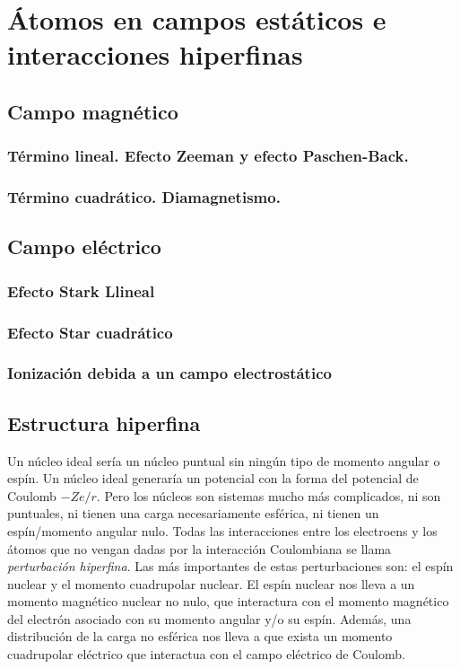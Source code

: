 \chapter{Átomos en campos estáticos e interacciones hiperfinas} \label{Ch:02}

\section{Campo magnético}

\subsection{Término lineal. Efecto Zeeman y efecto Paschen-Back.}

\subsection{Término cuadrático. Diamagnetismo.}

\section{Campo eléctrico}

\subsection{Efecto Stark Llineal}

\subsection{Efecto Star cuadrático}

\subsection{Ionización debida a un campo electrostático}

\section{Estructura hiperfina}

Un núcleo ideal sería un núcleo puntual sin ningún tipo de momento angular o espín. Un núcleo ideal generaría un potencial con la forma del potencial de Coulomb $-Ze/r$. Pero los núcleos son sistemas mucho más complicados, ni son puntuales, ni tienen una carga necesariamente esférica, ni tienen un espín/momento angular nulo. Todas las interacciones entre los electroens y los átomos que no vengan dadas por la interacción Coulombiana se llama \textit{perturbación hiperfina}. Las más importantes de estas perturbaciones son: el espín nuclear y el momento cuadrupolar nuclear. El espín nuclear nos lleva a un momento magnético nuclear no nulo, que interactura con el momento magnético del electrón asociado con su momento angular y/o su espín. Además, una distribución de la carga no esférica nos lleva a que exista un momento cuadrupolar eléctrico que interactua con el campo eléctrico de Coulomb.


